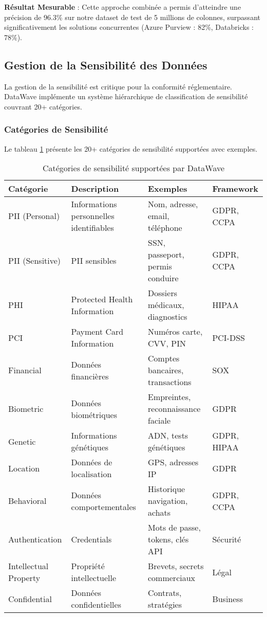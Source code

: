 \textbf{Résultat Mesurable} : Cette approche combinée a permis d'atteindre une précision de 96.3\% sur notre dataset de test de 5 millions de colonnes, surpassant significativement les solutions concurrentes (Azure Purview : 82\%, Databricks : 78\%).

\subsection{Gestion de la Sensibilité des Données}

La gestion de la sensibilité est critique pour la conformité réglementaire. DataWave implémente un système hiérarchique de classification de sensibilité couvrant 20+ catégories.

\subsubsection{Catégories de Sensibilité}

Le tableau \ref{tab:categories_sensibilite} présente les 20+ catégories de sensibilité supportées avec exemples.

\begin{table}[htpb]
\centering
\caption{Catégories de sensibilité supportées par DataWave}
\label{tab:categories_sensibilite}
\begin{tabular}{|p{}|p{}|p{}|p{}|}
\hline
\textbf{Catégorie} & \textbf{Description} & \textbf{Exemples} & \textbf{Framework} \\
\hline
PII (Personal) & Informations personnelles identifiables & Nom, adresse, email, téléphone & GDPR, CCPA \\
\hline
PII (Sensitive) & PII sensibles & SSN, passeport, permis conduire & GDPR, CCPA \\
\hline
PHI & Protected Health Information & Dossiers médicaux, diagnostics & HIPAA \\
\hline
PCI & Payment Card Information & Numéros carte, CVV, PIN & PCI-DSS \\
\hline
Financial & Données financières & Comptes bancaires, transactions & SOX \\
\hline
Biometric & Données biométriques & Empreintes, reconnaissance faciale & GDPR \\
\hline
Genetic & Informations génétiques & ADN, tests génétiques & GDPR, HIPAA \\
\hline
Location & Données de localisation & GPS, adresses IP & GDPR \\
\hline
Behavioral & Données comportementales & Historique navigation, achats & GDPR, CCPA \\
\hline
Authentication & Credentials & Mots de passe, tokens, clés API & Sécurité \\
\hline
Intellectual Property & Propriété intellectuelle & Brevets, secrets commerciaux & Légal \\
\hline
Confidential & Données confidentielles & Contrats, stratégies & Business \\
\hline
\end{tabular}
\end{table}

